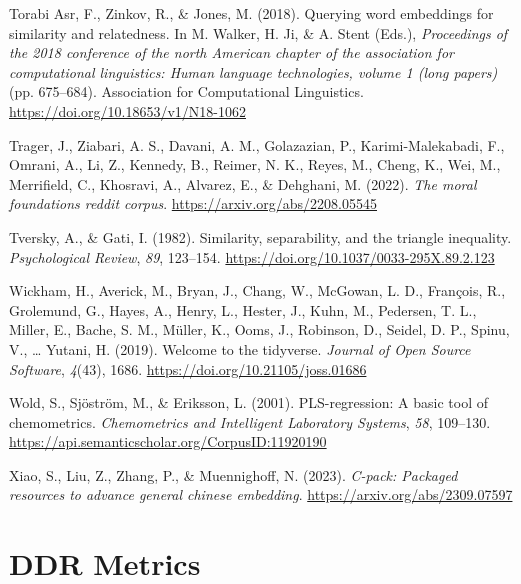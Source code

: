 \documentclass[
  man,
  floatsintext,
  longtable,
  nolmodern,
  notxfonts,
  notimes,
  colorlinks=true,linkcolor=blue,citecolor=blue,urlcolor=blue]{apa7}
\newlength{\cslhangindent}
\newenvironment{CSLReferences}[2] %
 {\begin{list}{}{%
  \setlength{\itemindent}{0pt}
  \setlength{\leftmargin}{0pt}
  \setlength{\parsep}{0pt}
  \ifodd #1
   \setlength{\leftmargin}{\cslhangindent}
   \setlength{\itemindent}{-1\cslhangindent}
  \fi
  \setlength{\itemsep}{#2\baselineskip}}}
 {\end{list}}
\begin{document}
\begin{CSLReferences}{1}{0}
Torabi Asr, F., Zinkov, R., \& Jones, M. (2018). Querying word
embeddings for similarity and relatedness. In M. Walker, H. Ji, \& A.
Stent (Eds.), \emph{Proceedings of the 2018 conference of the north
{A}merican chapter of the association for computational linguistics:
Human language technologies, volume 1 (long papers)} (pp. 675--684).
Association for Computational Linguistics.
\url{https://doi.org/10.18653/v1/N18-1062}

Trager, J., Ziabari, A. S., Davani, A. M., Golazazian, P.,
Karimi-Malekabadi, F., Omrani, A., Li, Z., Kennedy, B., Reimer, N. K.,
Reyes, M., Cheng, K., Wei, M., Merrifield, C., Khosravi, A., Alvarez,
E., \& Dehghani, M. (2022). \emph{The moral foundations reddit corpus}.
\url{https://arxiv.org/abs/2208.05545}

Tversky, A., \& Gati, I. (1982). Similarity, separability, and the
triangle inequality. \emph{Psychological Review}, \emph{89}, 123--154.
\url{https://doi.org/10.1037/0033-295X.89.2.123}

Wickham, H., Averick, M., Bryan, J., Chang, W., McGowan, L. D.,
François, R., Grolemund, G., Hayes, A., Henry, L., Hester, J., Kuhn, M.,
Pedersen, T. L., Miller, E., Bache, S. M., Müller, K., Ooms, J.,
Robinson, D., Seidel, D. P., Spinu, V., \ldots{} Yutani, H. (2019).
Welcome to the {tidyverse}. \emph{Journal of Open Source Software},
\emph{4}(43), 1686. \url{https://doi.org/10.21105/joss.01686}

Wold, S., Sjöström, M., \& Eriksson, L. (2001). PLS-regression: A basic
tool of chemometrics. \emph{Chemometrics and Intelligent Laboratory
Systems}, \emph{58}, 109--130.
\url{https://api.semanticscholar.org/CorpusID:11920190}

Xiao, S., Liu, Z., Zhang, P., \& Muennighoff, N. (2023). \emph{C-pack:
Packaged resources to advance general chinese embedding}.
\url{https://arxiv.org/abs/2309.07597}

\end{CSLReferences}

\appendix

\section{DDR Metrics}\label{ddr-metrics}
\end{document}
